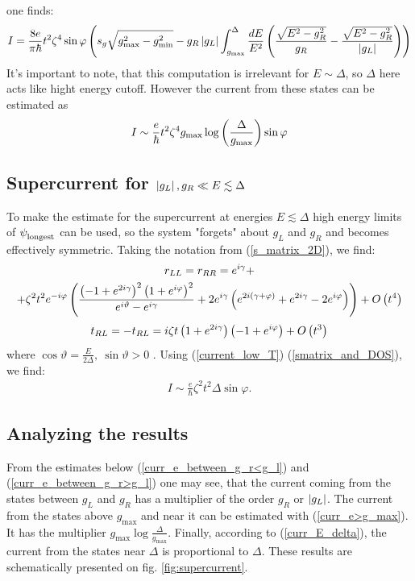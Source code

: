 one finds:
\begin{multline}
I
=
	\frac{8e}{\pi\hbar}t^2\zeta^4
	\sin \varphi
	\left(
	s_g\sqrt{g_{\mathrm{max}}^2-g_{\mathrm{min}}^2}
-
g_{R}\left|g_{L}\right|
\int_{g_{\mathrm{\mathrm{max}}}}^{\Delta}
\frac{dE}{E^2}
\left(
	\frac{\sqrt{E^2-g_{R}^2}}{g_{R}}
	-
	\frac{\sqrt{E^2-g_{R}^2}}{\left|g_{L}\right|}
\right)
	\right)
\end{multline}
It's important to note, that this computation is irrelevant for $ E\sim\Delta $, so $ \Delta $ here acts like hight energy cutoff. However the current from these states can be estimated as
\begin{gather}
\label{curr_e>g_max}
	I
	\sim
	\frac{e}{\hbar}t^2\zeta^4
	g_\mathrm{max}
	\log\left( \frac{\Delta}{g_\mathrm{max}}\right)
	\sin \varphi
\end{gather} 

\subsection{Supercurrent for $\left|g_L\right|, g_R\ll E \lesssim \Delta $}

\label{subsec:supercurrent_sim_Delta}

To make the estimate for the supercurrent at energies $ E\lesssim \Delta$ high energy limits of $ \psi_{\mathrm{longest}}^{\mathrm{}} $ can be used, so the system "forgets" about $ g_L $ and $ g_R $ and becomes effectively symmetric. Taking the notation from (\ref{s_matrix_2D}), we find:
\begin{multline}
	r_{LL}=r_{RR}
	=
	e^{i \gamma }+
	\\
	+
	\zeta ^2 t^2 e^{-i \varphi } \left(\frac{\left(-1+e^{2 i \gamma }\right)^2 \left(1+e^{i \varphi }\right)^2}{e^{i \vartheta }-e^{i \gamma }}+2 e^{i \gamma } \left(e^{2 i (\gamma +\varphi )}+e^{2 i \gamma }-2 e^{i \varphi }\right)\right)
	+O\left(t^4\right)
	\end{multline}
\begin{gather}
	t_{RL}=-t_{RL}
	=
	i \zeta  t\left(1+e^{2 i \gamma }\right)  \left(-1+e^{i \varphi }\right)
	+
	O\left(t^3 	\right)
\end{gather}
where $\cos\vartheta =\frac{E}{2\Delta},~ \sin\vartheta>0$ .
Using (\ref{current_low_T}) (\ref{smatrix_and_DOS}), we find:
\begin{gather}
\label{curr_E_delta}
I
\sim
	\frac{e}{\hbar}
	\zeta ^2 t^2\Delta
	\sin\varphi.
\end{gather}

\subsection{Analyzing the results}
From the estimates below 	(\ref{curr_e_between_g_r<g_l}) and (\ref{curr_e_between_g_r>g_l}) one may see, that the current coming from the states between $ g_L $ and $ g_R $ has a multiplier of the order $ g_{R} $ or $ \left|g_L\right| $. The current from the states above $ g_{\max} $ and near it can be estimated with (\ref{curr_e>g_max}). It has the multiplier $ g_{\mathrm{max}}\log\frac{\Delta}{g_{\mathrm{max}}} $. Finally, according to (\ref{curr_E_delta}), the current from the states near $ \Delta $ is proportional to $ \Delta $. These results are schematically presented on fig. \ref{fig:supercurrent}.


